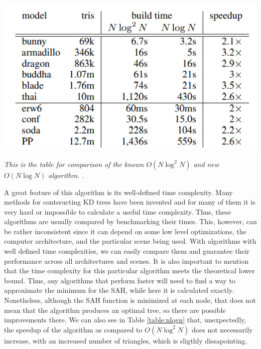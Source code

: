 \documentclass[12pt]{article}
\begin{document}
\begin{table}
\centering
\includegraphics{figs/nlognTable}
\caption{\textit{This is the table for comparison of the known $O(N\log^2N)$ and new $O(N\log N)$ algorithm. \cite[Table 2]{wald2006building}.}}
\label{table:nlogn}
\end{table}
\indent A great feature of this algorithm is its well-defined time complexity. Many methods for contsructing KD trees have been invented and for many of them it is very hard or impossible to calculate a useful time complexity. Thus, these algorithms are usually compared by benchmarking their times. This, however, can be rather inconsistent since it can depend on some low level optimizations, the computer architecture, and the particular scene being used. With algorithms with well defined time complexities, we can easily compare them and guarantee their performance across all architectures and scenes. It is also important to mention that the time complexity for this particular algorithm meets the theoretical lower bound. Thus, any algorithms that perform faster will need to find a way to approximate the minimum for the SAH, while here it is calculated exactly. Nonetheless, although the SAH function is minimized at each node, that does not mean that the algorithm produces an optimal tree, so there are possible improvements there. We can also see in Table \ref{table:nlogn} that, unexpectedly, the speedup of the algorithm as compared to $O(N\log^2N)$ does not necessarily increase, with an increased number of triangles, which is sligthly dissapointing.
\end{document}
